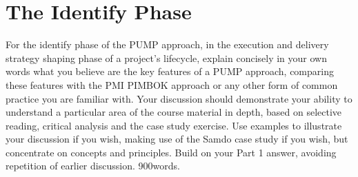 
\section{The Identify Phase} \label{s:Identify}
For the identify phase of the PUMP approach, in the execution and delivery strategy shaping phase of a project’s lifecycle, explain concisely in your own words what you believe are the key features of a PUMP approach, comparing these features with the PMI PIMBOK approach or any other form of common practice you are familiar with. Your discussion should demonstrate your ability to understand a particular area of the course material in depth, based on selective reading, critical analysis and the case study exercise. Use examples to illustrate your discussion if you wish, making use of the Samdo case study if you wish, but concentrate on concepts and principles. Build on your Part 1 answer, avoiding repetition of earlier discussion.
900words.
